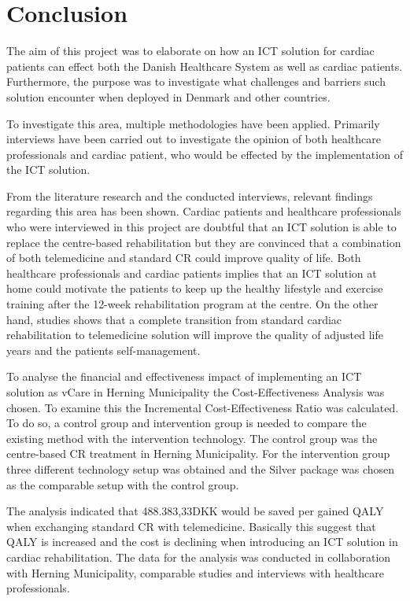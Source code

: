 \chapter{Conclusion}

The aim of this project was to elaborate on how an ICT solution for cardiac patients can effect both the Danish Healthcare System as well as cardiac patients. Furthermore, the purpose was to investigate what challenges and barriers such solution encounter when deployed in Denmark and other countries. 

To investigate this area, multiple methodologies have been applied. Primarily interviews have been carried out to investigate the opinion of both healthcare professionals and cardiac patient, who would be effected by the implementation of the ICT solution. 

From the literature research and the conducted interviews, relevant findings regarding this area has been shown. Cardiac patients and healthcare professionals who were interviewed in this project are doubtful that an ICT solution is able to replace the centre-based rehabilitation but they are convinced that a combination of both telemedicine and standard CR could improve quality of life. Both healthcare professionals and cardiac patients implies that an ICT solution at home could motivate the patients to keep up the healthy lifestyle and exercise training after the 12-week rehabilitation program at the centre. On the other hand, studies shows that a complete transition from standard cardiac rehabilitation to telemedicine solution will improve the quality of adjusted life years and the patients self-management. 

To analyse the financial and effectiveness impact of implementing an ICT solution as vCare in Herning Municipality the Cost-Effectiveness Analysis was chosen. To examine this the Incremental Cost-Effectiveness Ratio was calculated. To do so, a control group and intervention group is needed to compare the existing method with the intervention technology. The control group was the centre-based CR treatment in Herning Municipality. For the intervention group three different technology setup was obtained and the Silver package was chosen as the comparable setup with the control group.

The analysis indicated that 488.383,33DKK would be saved per gained QALY when exchanging standard CR with telemedicine. Basically this suggest that QALY is increased and the cost is declining when introducing an ICT solution in cardiac rehabilitation. The data for the analysis was conducted in collaboration with Herning Municipality, comparable studies and interviews with healthcare professionals.

